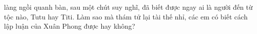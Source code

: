 làng ngồi quanh bàn, sau một chút suy nghĩ, đã biết được ngay ai là người đến từ tộc nào, Tutu hay Titi. Làm sao mà thám tử lại tài thế nhỉ, các em có biết cách lập luận của Xuân Phong được hay không?
%	
%
